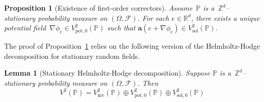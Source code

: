 \documentclass[11pt]{article} %
\numberwithin{equation}{section}
\newtheorem{proposition}[theorem]{Proposition}
\newtheorem{lemma}[theorem]{Lemma}
\theoremstyle{definition}
\newcommand*{\Zd}{\ensuremath{\mathbb{Z}^d}}
\newcommand*{\Rd}{\ensuremath{\mathbb{R}^d}}
\newcommand{\pot}{\mathrm{pot}}
\newcommand{\sol}{\mathrm{sol}}
\newcommand{\inv}{\mathrm{inv}}
\renewcommand{\a}{\mathbf{a}}
\newcommand{\F}{\mathcal{F}}
\renewcommand{\P}{\mathbb{P}}
\begin{document}
\begin{proposition}[Existence of first-order correctors]
\label{p.qual.correctors}
Assume~$\P$ is a~$\Zd$--stationary probability measure on $(\Omega,\F)$. For each $e\in \Rd$, there exists a unique potential field~$\nabla \phi_e \in V^2_{\pot,0}(\P)$ such that $\a(e+\nabla \phi_e)\in V^2_\sol(\P)$. 
\end{proposition}

The proof of Proposition~\ref{p.qual.correctors} relies on the following version of the Helmholtz-Hodge decomposition for stationary random fields. 

\begin{lemma}[Stationary Helmholtz-Hodge decomposition]
\label{l.stat.HH}
Suppose $\P$ is a~$\Zd$--stationary probability measure on $(\Omega,\F)$.
Then 
\begin{equation}
V^2(\P)
=
V^2_{\inv}(\P) \oplus
V^2_{\pot,0}(\P)
\oplus 
V^2_{\sol,0}(\P)
\end{equation}
\end{lemma}
\end{document}
